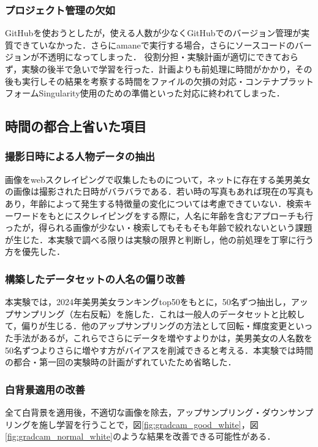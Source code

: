 \documentclass[a4paper,11pt,titlepage]{jsarticle}
\begin{document}
\subsubsection*{プロジェクト管理の欠如}
GitHubを使おうとしたが，使える人数が少なくGitHubでのバージョン管理が実質できていなかった．さらにamaneで実行する場合，さらにソースコードのバージョンが不透明になってしまった．
役割分担・実験計画が適切にできておらず，実験の後半で急いで学習を行った．計画よりも前処理に時間がかかり，その後も実行しその結果を考察する時間をファイルの欠損の対応・コンテナプラットフォームSingularity使用のための準備といった対応に終われてしまった．

\subsection{時間の都合上省いた項目}
\subsubsection*{撮影日時による人物データの抽出}
画像をwebスクレイピングで収集したものについて，ネットに存在する美男美女の画像は撮影された日時がバラバラである．若い時の写真もあれば現在の写真もあり，年齢によって発生する特徴量の変化については考慮できていない．検索キーワードをもとにスクレイピングをする際に，人名に年齢を含むアプローチも行ったが，得られる画像が少ない・検索してもそもそも年齢で絞れないという課題が生じた．本実験で調べる限りは実験の限界と判断し，他の前処理を丁寧に行う方を優先した．

\subsubsection*{構築したデータセットの人名の偏り改善}
本実験では，2024年美男美女ランキングtop50をもとに，50名ずつ抽出し，アップサンプリング（左右反転）を施した．これは一般人のデータセットと比較して，偏りが生じる．他のアップサンプリングの方法として回転・輝度変更といった手法があるが，これらでさらにデータを増やすよりかは，美男美女の人名数を50名ずつよりさらに増やす方がバイアスを削減できると考える．本実験では時間の都合・第一回の実験時の計画がずれていたため省略した．

\subsubsection*{白背景適用の改善}
全て白背景を適用後，不適切な画像を除去，アップサンプリング・ダウンサンプリングを施し学習を行うことで，図\ref{fig:gradcam_good_white}，図\ref{fig:gradcam_normal_white}のような結果を改善できる可能性がある．
\end{document}
